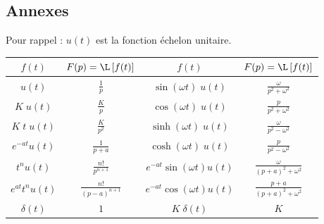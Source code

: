 %
%


\subsection{Annexes}


Pour rappel : $u(t)$ est la fonction échelon unitaire.
\renewcommand\arraystretch{1.3}
\begin{center}
\begin{tabular}{|c|c||c|c|}
	\hline
	$f(t)$			&		$\displaystyle F(p)=\L\left[f(t)\right]$		&	$f(t)$				&	$F(p)=\L\left[f(t)\right]$			\\[0.3cm]
	\hline\hline
	$u(t)$			&		$\displaystyle \frac 1p$				&	$\sin(\omega t)\;u(t)$		&	$\displaystyle \frac{\omega}{p^2+\omega^2}$	\\[0.3cm]
	\hline
	$K\;u(t)$		&		$\displaystyle \frac{K}{p}$				&	$\cos(\omega t)\;u(t)$		&	$\displaystyle \frac{p}{p^2+\omega^2}$		\\[0.3cm]
	\hline
	$K\;t\;u(t)$		&		$\displaystyle \frac K{p^2}$				&	$\sinh(\omega t)\;u(t)$		&	$\displaystyle \frac \omega{p^2-\omega^2}$	\\[0.3cm]
	\hline
	$e^{-at}u(t)$		&		$\displaystyle \frac{1}{p+a}$				&	$\cosh(\omega t)\;u(t)$		&	$\displaystyle \frac{p}{p^2-\omega^2}$		\\[0.3cm]
	\hline
	$t^nu(t)$		&		$\displaystyle \frac{n!}{p^{n+1}}$			&	$e^{-at}\sin(\omega t)u(t)$	&	$\displaystyle \frac \omega{(p+a)^2+\omega^2}$	\\[0.3cm]
	\hline
	$e^{at} t^n u(t)$	&		$\displaystyle \frac{n!}{(p-a)^{n+1}}$			&	$e^{-at}\cos(\omega t) u(t)$	&	$\displaystyle \frac{p+a}{(p+a)^2+\omega^2}$	\\[0.3cm]
	\hline
	$\delta(t)$		&		$1$							&	$K\;\delta(t)$			&	$K$						\\[0.3cm]
	\hline
\end{tabular}
\end{center}
